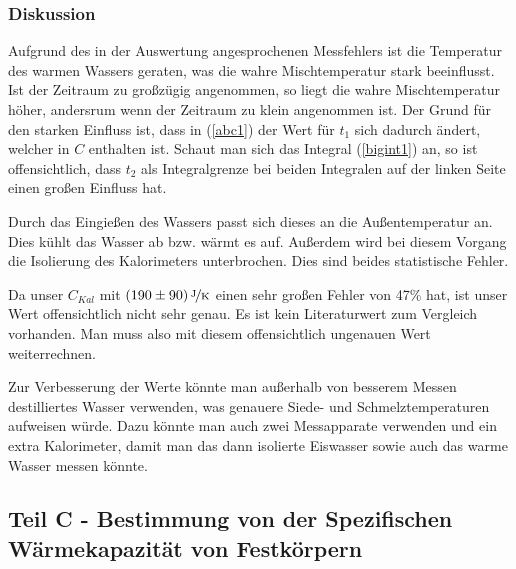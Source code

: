 \documentclass[11pt,a4paper]{article}
\begin{document}
%




\subsubsection{Diskussion}

Aufgrund des in der Auswertung angesprochenen Messfehlers ist die Temperatur des warmen Wassers geraten, was die wahre Mischtemperatur stark beeinflusst. Ist der Zeitraum zu gro\ss z\"ugig angenommen, so liegt die wahre Mischtemperatur h\"oher, andersrum wenn der Zeitraum zu klein angenommen ist. Der Grund f\"ur den starken Einfluss ist, dass in (\ref{abc1}) der Wert f\"ur $t_1$ sich dadurch \"andert, welcher in $C$ enthalten ist. Schaut man sich das Integral (\ref{bigint1}) an, so ist offensichtlich, dass $t_2$ als Integralgrenze bei beiden Integralen auf der linken Seite einen gro\ss en Einfluss hat.

Durch das Eingie\ss en des Wassers passt sich dieses an die Au\ss entemperatur an. Dies k\"uhlt das Wasser ab bzw. w\"armt es auf. Au\ss erdem wird bei diesem Vorgang die Isolierung des Kalorimeters unterbrochen. Dies sind beides statistische Fehler.

Da unser $C_{Kal}$ mit $(190\pm90)\,\nicefrac{\mathrm{J}}{\mathrm{K}}$ einen sehr gro\ss en Fehler von 47\% hat, ist unser Wert offensichtlich nicht sehr genau. Es ist kein Literaturwert zum Vergleich vorhanden. Man muss also mit diesem offensichtlich ungenauen Wert weiterrechnen.

Zur Verbesserung der Werte k\"onnte man au\ss erhalb von besserem Messen destilliertes Wasser verwenden, was genauere Siede- und Schmelztemperaturen aufweisen w\"urde. Dazu k\"onnte man auch zwei Messapparate verwenden und ein extra Kalorimeter, damit man das dann isolierte Eiswasser sowie auch das warme Wasser messen k\"onnte.

\pagebreak

\subsection{Teil C - Bestimmung von der Spezifischen W\"armekapazit\"at von Festk\"orpern}
\end{document}
